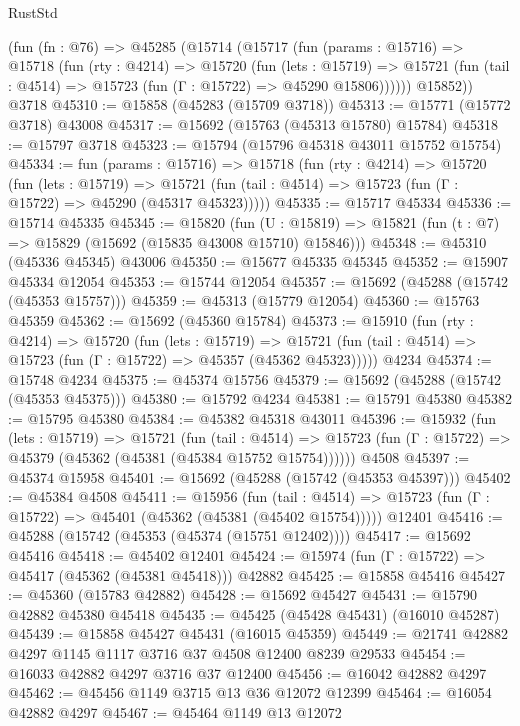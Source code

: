 \begin{lexlean}{RustStd}
\begin{coremodule}
    (fun (fn : @76) =>
    @45285
      (@15714
        (@15717
          (fun (params : @15716) =>
          @15718
            (fun (rty : @4214) =>
            @15720
              (fun (lets : @15719) =>
              @15721 (fun (tail : @4514) => @15723 (fun (Γ : @15722) => @45290 @15806))))))
        @15852))
    @3718
@45310 := @15858 (@45283 (@15709 @3718))
@45313 := @15771 (@15772 @3718) @43008
@45317 := @15692 (@15763 (@45313 @15780) @15784)
@45318 := @15797 @3718
@45323 := @15794 (@15796 @45318 @43011 @15752 @15754)
@45334 := fun (params : @15716) =>
  @15718
    (fun (rty : @4214) =>
    @15720
      (fun (lets : @15719) =>
      @15721 (fun (tail : @4514) => @15723 (fun (Γ : @15722) => @45290 (@45317 @45323)))))
@45335 := @15717 @45334
@45336 := @15714 @45335
@45345 := @15820
    (fun (U : @15819) => @15821 (fun (t : @7) => @15829 (@15692 (@15835 @43008 @15710) @15846)))
@45348 := @45310 (@45336 @45345) @43006
@45350 := @15677 @45335 @45345
@45352 := @15907 @45334 @12054
@45353 := @15744 @12054
@45357 := @15692 (@45288 (@15742 (@45353 @15757)))
@45359 := @45313 (@15779 @12054)
@45360 := @15763 @45359
@45362 := @15692 (@45360 @15784)
@45373 := @15910
    (fun (rty : @4214) =>
    @15720
      (fun (lets : @15719) =>
      @15721 (fun (tail : @4514) => @15723 (fun (Γ : @15722) => @45357 (@45362 @45323)))))
    @4234
@45374 := @15748 @4234
@45375 := @45374 @15756
@45379 := @15692 (@45288 (@15742 (@45353 @45375)))
@45380 := @15792 @4234
@45381 := @15791 @45380
@45382 := @15795 @45380
@45384 := @45382 @45318 @43011
@45396 := @15932
    (fun (lets : @15719) =>
    @15721
      (fun (tail : @4514) =>
      @15723 (fun (Γ : @15722) => @45379 (@45362 (@45381 (@45384 @15752 @15754))))))
    @4508
@45397 := @45374 @15958
@45401 := @15692 (@45288 (@15742 (@45353 @45397)))
@45402 := @45384 @4508
@45411 := @15956
    (fun (tail : @4514) => @15723 (fun (Γ : @15722) => @45401 (@45362 (@45381 (@45402 @15754)))))
    @12401
@45416 := @45288 (@15742 (@45353 (@45374 (@15751 @12402))))
@45417 := @15692 @45416
@45418 := @45402 @12401
@45424 := @15974 (fun (Γ : @15722) => @45417 (@45362 (@45381 @45418))) @42882
@45425 := @15858 @45416
@45427 := @45360 (@15783 @42882)
@45428 := @15692 @45427
@45431 := @15790 @42882 @45380 @45418
@45435 := @45425 (@45428 @45431) (@16010 @45287)
@45439 := @15858 @45427 @45431 (@16015 @45359)
@45449 := @21741 @42882 @4297 @1145 @1117 @3716 @37 @4508 @12400 @8239 @29533
@45454 := @16033 @42882 @4297 @3716 @37 @12400
@45456 := @16042 @42882 @4297
@45462 := @45456 @1149 @3715 @13 @36 @12072 @12399
@45464 := @16054 @42882 @4297
@45467 := @45464 @1149 @13 @12072

\end{coremodule}
\end{lexlean}
